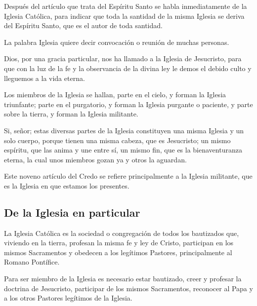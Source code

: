  Después del artículo que trata del
Espíritu Santo se habla inmediatamente de la Iglesia Católica, para indicar que
toda la santidad de la misma Iglesia se deriva del Espíritu Santo, que es el autor de toda santidad.

 La palabra Iglesia quiere decir
convocación o reunión de muchas personas.

 Dios,
por una gracia particular, nos ha llamado a la Iglesia de Jesucristo, para que con la luz de la fe y la observancia de la divina ley le demos el debido culto y lleguemos a la vida eterna.

 Los miembros de la
Iglesia se hallan, parte en el cielo, y forman la Iglesia triunfante; parte en el
purgatorio, y forman la Iglesia purgante o paciente, y parte sobre la tierra, y
forman la Iglesia militante.

 Si,
señor; estas diversas partes de la Iglesia constituyen una misma Iglesia y un solo
cuerpo, porque tienen una misma cabeza, que es Jesucristo; un mismo espíritu,
que las anima y une entre sí, un mismo fin, que es la bienaventuranza eterna, la
cual unos miembros gozan ya y otros la aguardan.

 Este noveno artículo del Credo se refiere principalmente a
la Iglesia militante, que es la Iglesia en que estamos los presentes.

\subsection{De la Iglesia en particular}

 La Iglesia Católica es la sociedad o
congregación de todos los bautizados que, viviendo en la tierra, profesan la misma
fe y ley de Cristo, participan en los mismos Sacramentos y obedecen a los
legítimos Pastores, principalmente al Romano Pontífice.

 Para ser miembro de la Iglesia es necesario estar bautizado, creer y
profesar la doctrina de Jesucristo, participar de los mismos Sacramentos,
reconocer al Papa y a los otros Pastores legítimos de la Iglesia.

